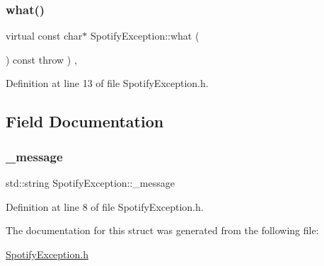 \subsubsection{\texorpdfstring{what()}{what()}}
{\footnotesize\ttfamily virtual const char$\ast$ Spotify\+Exception\+::what (\begin{DoxyParamCaption}{ }\end{DoxyParamCaption}) const throw  ) \hspace{0.3cm}{\ttfamily [inline]}, {\ttfamily [virtual]}}



Definition at line 13 of file Spotify\+Exception.\+h.



\subsection{Field Documentation}
\mbox{\label{struct_spotify_exception_ab01d942d5a833f0be7dfc31454396895}} 
\subsubsection{\texorpdfstring{\+\_\+message}{\_message}}
{\footnotesize\ttfamily std\+::string Spotify\+Exception\+::\+\_\+message\hspace{0.3cm}{\ttfamily [private]}}



Definition at line 8 of file Spotify\+Exception.\+h.



The documentation for this struct was generated from the following file\+:\begin{DoxyCompactItemize}
\item 
\mbox{\hyperlink{_spotify_exception_8h}{Spotify\+Exception.\+h}}\end{DoxyCompactItemize}
